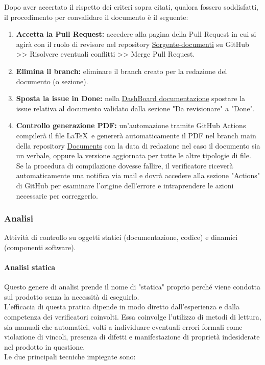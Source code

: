 Dopo aver accertato il rispetto dei criteri sopra citati, qualora fossero soddisfatti, il procedimento per convalidare il documento è il seguente:

\begin{enumerate}
    \item \textbf{Accetta la Pull Request:} 
        accedere alla pagina della Pull Request in cui si agirà con il ruolo di revisore nel repository \href{https://github.com/ByteOps-swe/Sorgente-documenti}{Sorgente-documenti} su GitHub >> Risolvere eventuali conflitti >> Merge Pull Request.
    \item \textbf{Elimina il branch:} 
        eliminare il branch creato per la redazione del documento (o sezione).
    \item \textbf{Sposta la issue in Done:} 
        nella \href{https://github.com/orgs/ByteOps-swe/projects/1/views/1}{DashBoard documentazione} spostare la issue relativa al documento validato dalla sezione "Da revisionare" a "Done".
    \item \textbf{Controllo generazione PDF:} 
        un'automazione tramite GitHub Actions compilerà il file \LaTeX\ e genererà automaticamente il PDF nel branch main della repository \href{https://github.com/ByteOps-swe/Documents}{Documents} con la data di redazione nel caso il documento sia un verbale, oppure la versione aggiornata per tutte le altre tipologie di file. \\
        Se la procedura di compilazione dovesse fallire, il verificatore riceverà automaticamente una notifica via mail e dovrà accedere alla sezione "Actions" di GitHub per esaminare l'origine dell'errore e intraprendere le azioni necessarie per correggerlo.
\end{enumerate}

\subsubsection{Analisi}
Attività di controllo su oggetti statici (documentazione, codice) e dinamici (componenti software).

\paragraph{Analisi statica}
Questo genere di analisi prende il nome di "statica" proprio perché viene condotta sul prodotto senza la necessità di eseguirlo. \\ L'efficacia di questa pratica dipende in modo diretto dall'esperienza e dalla competenza dei verificatori coinvolti. Essa coinvolge l'utilizzo di metodi di lettura, sia manuali che automatici, volti a individuare eventuali errori formali come violazione di vincoli, presenza di difetti e manifestazione di proprietà indesiderate nel prodotto in questione. \\
Le due principali tecniche impiegate sono:

